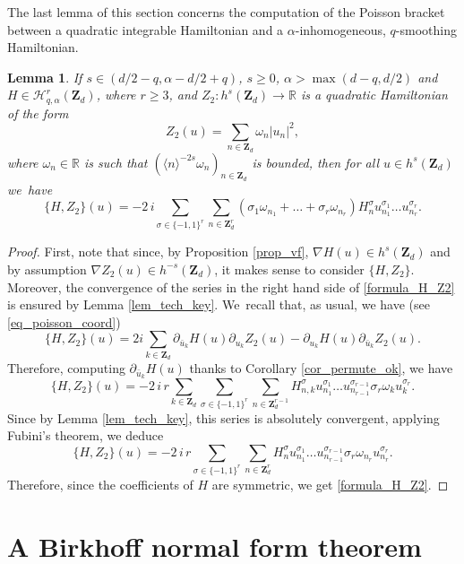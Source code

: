 \documentclass[11pt]{article}
\newtheorem{lemma}[theorem]{Lemma}
\theoremstyle{definition}
\begin{document}
The last lemma of this section concerns the computation of the Poisson bracket between a quadratic integrable Hamiltonian and a $\alpha$-inhomogeneous, $q$-smoothing Hamiltonian.
\begin{lemma}
\label{lem_Z2_vs_H}
If $s\in (d/2-q, \alpha-d/2+q)$, $s\geq 0$, $\alpha >\max(d-q,d/2)$ and $ H\in \mathscr{H}_{q,\alpha}^r(\mathbf{Z}_d)$, where $r\geq 3$, and
$Z_2: h^s(\mathbf{Z}_d) \to \mathbb{R}$ is a quadratic Hamiltonian of the form
\[
Z_2(u) = \sum_{n\in \mathbf{Z}_d} \omega_n |u_n|^2,
\]
where $\omega_n \in \mathbb{R}$ is such that $(\langle n \rangle^{-2s} \omega_n)_{n\in \mathbf{Z}_d}$ is bounded, then for all $u\in h^s(\mathbf{Z}_d)$ we~have%
\begin{equation}
\label{formula_H_Z2}
\{ H, Z_2\}(u) = -2 \, i \sum_{\sigma \in \{-1,1\}^{r}} \sum_{n\in \mathbf{Z}_d^r } (\sigma_1 \omega_{n_1} + \dots + \sigma_r \omega_{n_r}) H_{n}^{\sigma} u_{n_1}^{\sigma_1} \dots u_{n_r}^{\sigma_r}.
\end{equation}
\end{lemma}
\begin{proof} First, note that since, by Proposition \ref{prop_vf}, $\nabla H(u) \in h^s(\mathbf{Z}_d)$ and by assump\-tion $\nabla Z_2(u) \in h^{-s}(\mathbf{Z}_d)$, it makes sense to consider $\{ H, Z_2\}$. Moreover, the convergence of the series in the right hand side of \eqref{formula_H_Z2} is ensured by Lemma \ref{lem_tech_key}.
We~recall that, as usual, we have (see \eqref{eq_poisson_coord})
\[
\{ H, Z_2\}(u) = 2i \sum_{k\in \mathbf{Z}_d} \partial_{\bar{u}_k}H(u) \partial_{u_k} Z_2(u) - \partial_{u_k}H(u) \partial_{\bar{u}_k} Z_2(u).
\]
Therefore, computing $\partial_{\bar{u}_k}H(u)$ thanks to Corollary \ref{cor_permute_ok}, we have
\[
\{ H, Z_2\}(u) = -2 \, i \,r \sum_{k\in \mathbf{Z}_d} \sum_{\sigma \in \{-1,1\}^{r}} \sum_{n\in \mathbf{Z}_d^{r-1} } H_{n,k}^{\sigma} u_{n_1}^{\sigma_1} \dots u_{n_{r-1}}^{\sigma_{r-1}} \sigma_r \omega_k u_k^{\sigma_r}.
\]
Since by Lemma \ref{lem_tech_key}, this series is absolutely convergent, applying Fubini's theorem, we deduce
\[
\{ H, Z_2\}(u) = -2 \, i\,r \sum_{\sigma \in \{-1,1\}^{r}} \sum_{n\in \mathbf{Z}_d^r } H_{n}^{\sigma} u_{n_1}^{\sigma_1} \dots u_{n_{r-1}}^{\sigma_{r-1}} \sigma_r \omega_{n_r} u_{n_r}^{\sigma_r}.
\]
Therefore, since the coefficients of $H$ are symmetric, we get \eqref{formula_H_Z2}.
\end{proof}

\section{A Birkhoff normal form theorem}
\end{document}
